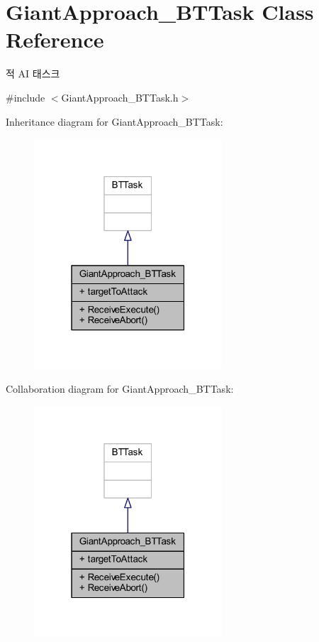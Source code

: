 \hypertarget{class_giant_approach___b_t_task}{}\section{Giant\+Approach\+\_\+\+B\+T\+Task Class Reference}
\label{class_giant_approach___b_t_task}


적 AI 태스크  




{\ttfamily \#include $<$Giant\+Approach\+\_\+\+B\+T\+Task.\+h$>$}



Inheritance diagram for Giant\+Approach\+\_\+\+B\+T\+Task\+:
\nopagebreak
\begin{figure}[H]
\begin{center}
\leavevmode
\includegraphics[width=199pt]{class_giant_approach___b_t_task__inherit__graph}
\end{center}
\end{figure}


Collaboration diagram for Giant\+Approach\+\_\+\+B\+T\+Task\+:
\nopagebreak
\begin{figure}[H]
\begin{center}
\leavevmode
\includegraphics[width=199pt]{class_giant_approach___b_t_task__coll__graph}
\end{center}
\end{figure}
